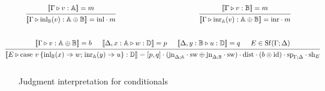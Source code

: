 \documentclass[10pt,a4paper]{amsart}
\theoremstyle{definition}
\theoremstyle{definition}
\theoremstyle{definition}
\theoremstyle{definition}
\theoremstyle{definition}
\theoremstyle{definition}
\begin{document}
\begin{figure}[H]
  \begin{equation*}
  \begin{aligned}
  &\hspace{10pt}
  \begin{prooftree}
      \hypo{ [\![\Gamma \triangleright v: \mathbb{A}]\!] = m }
      \infer1[]{ [\![ \Gamma \triangleright \text{inl}_{\mathbb{B}} (v):  \mathbb{A} \oplus \mathbb{B}  ]\!] = \inl  \comp m}
  \end{prooftree}
  \hspace{120pt}
  \begin{prooftree}
    \hypo{ [\![\Gamma \triangleright v: \mathbb{B}]\!] = m }
    \infer1[]{ [\![ \Gamma \triangleright \text{inr}_{\mathbb{A}} (v):  \mathbb{A} \oplus \mathbb{B}  ]\!] = \inr  \comp m}
\end{prooftree}
  \\[20pt]
  &\hspace{-20pt}
  \begin{prooftree}
      \hypo{[\![\Gamma\triangleright v: \mathbb{A} \oplus \mathbb{B} ]\!] = b}
      \hypo{[\![\Delta, x:\mathbb{A} \triangleright w: \mathbb{D} ]\!] = p}
      \hypo{ [\![\Delta,y:\mathbb{B} \triangleright u: \mathbb{D} ]\!] = q }
      \hypo{E \in \Shuff(\Gamma; \Delta)}
      \infer4[]{ [\![E \vljud \text{case } v \hspace{2pt}  \{\text{inl}_{\mathbb{B}} (x) \Rightarrow w ; \hspace{1pt} \text{inr}_{\mathbb{A}} (y) \Rightarrow u\}: \mathbb{D} ]\!] =   [p,q] \comp (\text{jn}_{\Delta;\typeA}\comp \sw \oplus \text{jn}_{\Delta;\mathbb{B}}\comp \sw) \comp \dist \comp (b \otimes \text{id}) \cdot \text{sp}_{\Gamma;\Delta} \cdot \text{sh}_{E}}
  \end{prooftree}
  \\[10pt]
  \end{aligned}
  \end{equation*}
  \caption{Judgment interpretation for conditionals}
\label{fig:denotational_sem cond}
\end{figure}
\end{document}
